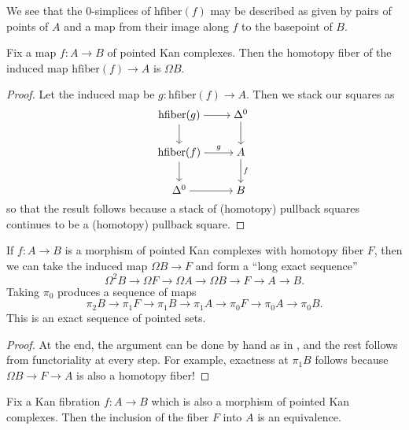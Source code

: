 \documentclass[../notes.tex]{subfiles}
\begin{document}
\begin{remark}
	We see that the $0$-simplices of $\mathrm{hfiber}(f)$ may be described as given by pairs of points of $A$ and a map from their image along $f$ to the basepoint of $B$.
\end{remark}
\begin{lemma}
	Fix a map $f\colon A\to B$ of pointed Kan complexes. Then the homotopy fiber of the induced map $\mathrm{hfiber}(f)\to A$ is $\Omega B$.
\end{lemma}
\begin{proof}
	Let the induced map be $g\colon \mathrm{hfiber}(f)\to A$. Then we stack our squares as
	\[\begin{tikzcd}[cramped]
		{\mathrm{hfiber}(g)} & {\Delta^0} \\
		{\mathrm{hfiber}(f)} & A \\
		{\Delta^0} & B
		\arrow[from=1-1, to=1-2]
		\arrow[from=1-1, to=2-1]
		\arrow[from=1-2, to=2-2]
		\arrow["g", from=2-1, to=2-2]
		\arrow[from=2-1, to=3-1]
		\arrow["f", from=2-2, to=3-2]
		\arrow[from=3-1, to=3-2]
	\end{tikzcd}\]
	so that the result follows because a stack of (homotopy) pullback squares continues to be a (homotopy) pullback square.
\end{proof}
\begin{theorem}
	If $f\colon A\to B$ is a morphism of pointed Kan complexes with homotopy fiber $F$, then we can take the induced map $\Omega B\to F$ and form a ``long exact sequence''
	\[\Omega^2B\to\Omega F\to\Omega A\to\Omega B\to F\to A\to B.\]
	Taking $\pi_0$ produces a sequence of maps
	\[\pi_2B\to\pi_1F\to\pi_1B\to\pi_1A\to\pi_0F\to\pi_0A\to\pi_0B.\]
	This is an exact sequence of pointed sets.
\end{theorem}
\begin{proof}
	At the end, the argument can be done by hand as in , and the rest follows from functoriality at every step. For example, exactness at $\pi_1B$ follows because $\Omega B\to F\to A$ is also a homotopy fiber!
\end{proof}
\begin{theorem}
	Fix a Kan fibration $f\colon A\to B$ which is also a morphism of pointed Kan complexes. Then the inclusion of the fiber $F$ into $A$ is an equivalence.
\end{theorem}
\end{document}
